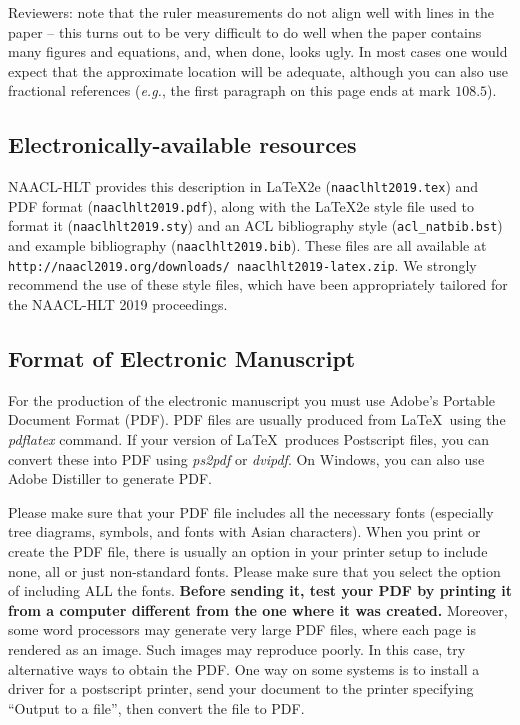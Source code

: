 \documentclass[11pt,a4paper]{article}
\begin{document}
Reviewers: note that the ruler measurements do not align well with
lines in the paper -- this turns out to be very difficult to do well
when the paper contains many figures and equations, and, when done,
looks ugly. In most cases one would expect that the approximate
location will be adequate, although you can also use fractional
references ({\em e.g.}, the first paragraph on this page ends at mark $108.5$).

\subsection{Electronically-available resources}

NAACL-HLT provides this description in \LaTeX2e{} ({\small\tt naaclhlt2019.tex}) and PDF
format ({\small\tt naaclhlt2019.pdf}), along with the \LaTeX2e{} style file used to
format it ({\small\tt naaclhlt2019.sty}) and an ACL bibliography style ({\small\tt acl\_natbib.bst})
and example bibliography ({\small\tt naaclhlt2019.bib}).
These files are all available at
{\small\tt http://naacl2019.org/downloads/ naaclhlt2019-latex.zip}. 
 We
strongly recommend the use of these style files, which have been
appropriately tailored for the NAACL-HLT 2019 proceedings.

\subsection{Format of Electronic Manuscript}
\label{sect:pdf}

For the production of the electronic manuscript you must use Adobe's
Portable Document Format (PDF). PDF files are usually produced from
\LaTeX\ using the \textit{pdflatex} command. If your version of
\LaTeX\ produces Postscript files, you can convert these into PDF
using \textit{ps2pdf} or \textit{dvipdf}. On Windows, you can also use
Adobe Distiller to generate PDF.

Please make sure that your PDF file includes all the necessary fonts
(especially tree diagrams, symbols, and fonts with Asian
characters). When you print or create the PDF file, there is usually
an option in your printer setup to include none, all or just
non-standard fonts.  Please make sure that you select the option of
including ALL the fonts. \textbf{Before sending it, test your PDF by
  printing it from a computer different from the one where it was
  created.} Moreover, some word processors may generate very large PDF
files, where each page is rendered as an image. Such images may
reproduce poorly. In this case, try alternative ways to obtain the
PDF. One way on some systems is to install a driver for a postscript
printer, send your document to the printer specifying ``Output to a
file'', then convert the file to PDF.
\end{document}
